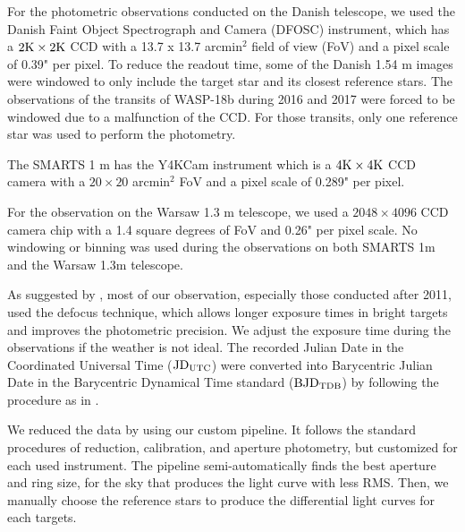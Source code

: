 For the photometric observations conducted on the Danish telescope, we used the Danish Faint Object Spectrograph and Camera (DFOSC) instrument, which has a $2{\rm K} \times 2{\rm K}$ CCD with a 13.7 x 13.7 arcmin$^2$ field of view (FoV) and a pixel scale of 0.39" per pixel. To reduce the readout time, some of the Danish 1.54 m images were windowed to only include the target star and its closest reference stars. The observations of the transits of WASP-18b during 2016 and 2017 were forced to be windowed due to a malfunction of the CCD. For those transits, only one reference star was used to perform the photometry.

The SMARTS 1 m has the Y4KCam instrument which is a $4{\rm K} \times 4{\rm K}$ CCD camera with a $20\times20$ arcmin$^2$ FoV and a pixel scale of 0.289" per pixel. 

For the observation on the Warsaw 1.3 m telescope, we used a $2048 \times 4096$ CCD camera chip with a 1.4 square degrees of FoV and 0.26" per pixel scale. No windowing or binning was used during the observations on both SMARTS 1m and the Warsaw 1.3m telescope.

As suggested by \cite{Southworth2009}, most of our observation, especially those conducted after 2011, used the defocus technique, which allows longer exposure times in bright targets and improves the photometric precision. We adjust the exposure time during the observations if the weather is not ideal. The recorded Julian Date in the Coordinated Universal Time (${\rm JD_{UTC}}$) were converted into Barycentric Julian Date in the Barycentric Dynamical Time standard (${\rm BJD_{TDB}}$) by following the procedure as in \citet{Eastman2010}.

We reduced the data by using our custom pipeline. It follows the standard procedures of reduction, calibration, and aperture photometry, but customized for each used instrument. The pipeline semi-automatically finds the best aperture and ring size, for the sky that produces the light curve with less RMS. Then, we manually choose the reference stars to produce the differential light curves for each targets.


